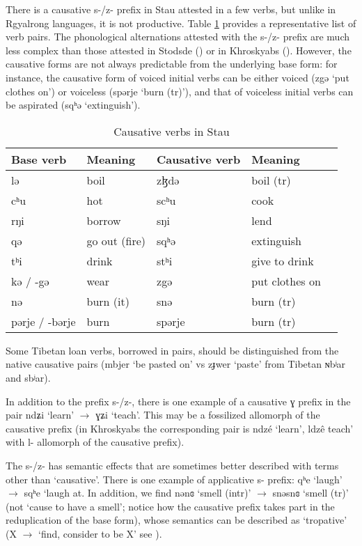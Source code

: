 \documentclass[oneside,a4paper,11pt]{article}
\newcommand{\ipa}[1]{{\phon#1}} %
\begin{document}
There is a causative \ipa{s-/z-} prefix in Stau attested in a few verbs, but unlike in Rgyalrong languages, it is not productive. Table \ref{tab:causative} provides a representative list of verb pairs. The phonological alternations attested with the \ipa{s-/z-} prefix are much less complex than those attested in Stodsde (\citealt{jackson07shangzhai}) or in Khroskyabs (\citealt{lai14caus}). However, the causative forms are not always predictable from the underlying base form: for instance, the causative form of voiced initial verbs can be either voiced (\ipa{zgə} `put clothes on') or voiceless (\ipa{spərje} `burn (tr)'), and that of voiceless initial verbs can be aspirated (\ipa{sqʰə} `extinguish').
 
 
   \begin{table}[H]
 \caption{Causative verbs in Stau} \label{tab:causative} \centering 
\begin{tabular}{lllll}
\toprule
Base verb & Meaning & Causative verb & Meaning \\
\midrule
 \ipa{lə}  &boil& \ipa{zɮdə}& boil (tr)\\
  \ipa{cʰu}  & hot &  \ipa{scʰu}& cook \\
    \ipa{rŋi}  & borrow &  \ipa{sŋi}& lend \\
    \ipa{qə}  & go out (fire) &  \ipa{sqʰə}& extinguish\\
    \ipa{tʰi}  & drink &  \ipa{stʰi} & give to drink\\
    \ipa{kə} / \ipa{-gə} & wear &  \ipa{zgə} & put clothes on \\
     \ipa{nə}  & burn (it) &  \ipa{snə}& burn (tr)\\
     \ipa{pərje} / \ipa{-bərje} & burn &  \ipa{spərje} & burn (tr)\\
 \bottomrule
\end{tabular}
\end{table}

Some Tibetan loan verbs, borrowed in pairs, should be distinguished from the native causative pairs (\ipa{mbjer} `be pasted on' vs \ipa{zɟwer}  `paste' from Tibetan \ipa{ɴbʲar} and \ipa{sbʲar}).
 
 
 In addition to the prefix \ipa{s-/z-}, there is one example of a causative \ipa{ɣ} prefix in the pair   \ipa{ndʑi} `learn'    $\rightarrow$  \ipa{ɣʑi} `teach'. This may be a fossilized allomorph of the causative prefix (in Khroskyabs the corresponding pair is \ipa{ndzé} `learn', \ipa{ldzê}  teach' with \ipa{l-} allomorph of the causative prefix).
     
The \ipa{s-/z-} has semantic effects that are sometimes better described with terms other than `causative'. There is one example of applicative \ipa{s-} prefix: \ipa{qʰe}  `laugh' $\rightarrow$ \ipa{sqʰe} `laugh at. In addition, we find \ipa{nənɞ}  `smell (intr)' $\rightarrow$ \ipa{snəsnɞ} `smell (tr)' (not `cause to have a smell'; notice how the causative prefix takes part in the reduplication of the base form), whose semantics can be described as `tropative' (X $\rightarrow$ `find, consider to be X' see \citealt{jacques13tropative}).
\end{document}
